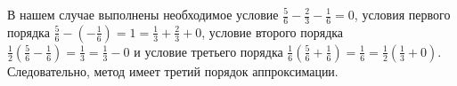 \documentclass[12pt]{article}
\begin{document}
В нашем случае выполнены необходимое условие $\frac{5}{6} - \frac{2}{3} - \frac{1}{6} = 0$, 
условия первого порядка $\frac{5}{6} - \left(-\frac{1}{6}\right) = 1 = \frac{1}{3} + \frac{2}{3} + 0$, условие второго порядка $\frac{1}{2}\left(\frac{5}{6} - \frac{1}{6}\right) = \frac{1}{3} = \frac{1}{3} - 0$ и условие третьего порядка $\frac{1}{6}\left(\frac{5}{6} + \frac{1}{6}\right) = \frac{1}{6} = \frac{1}{2}\left(\frac{1}{3} + 0\right)$. Следовательно, метод имеет третий порядок аппроксимации.

%
\end{document}
